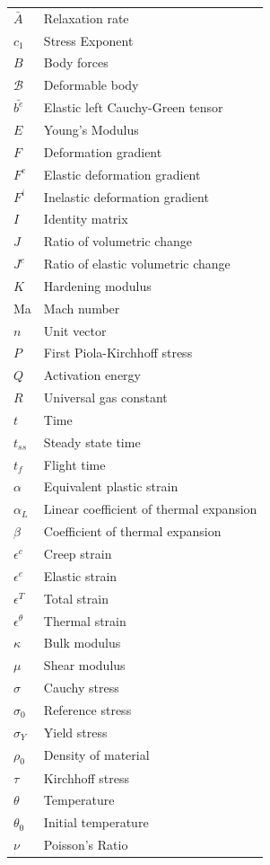 \documentclass[conf]{new-aiaa}
\begin{document}
{\renewcommand\arraystretch{1.0}
\noindent\begin{longtable*}{@{}l @{\quad=\quad} l@{}}
$\bar{A}$    & Relaxation rate\\
$c_1$        & Stress Exponent\\
$B$          & Body forces \\
$\mathcal{B}$& Deformable body \\
$\bar{b^e}$  & Elastic left Cauchy-Green tensor \\
$E$          & Young's Modulus \\
$F$          & Deformation gradient\\
$F^e$        & Elastic deformation gradient\\
$F^i$        & Inelastic deformation gradient\\
$I$          & Identity matrix \\
$J$          & Ratio of volumetric change\\
$J^e$        & Ratio of elastic volumetric change\\
$K$          & Hardening modulus \\
Ma           & Mach number\\
$n$          & Unit vector \\
$P$          & First Piola-Kirchhoff stress\\
$Q$          & Activation energy\\
$R$          & Universal gas constant\\
$t$          & Time\\
$t_{ss}$     & Steady state time\\
$t_{f}$      & Flight time \\
$\alpha$     & Equivalent plastic strain \\
$\alpha_L$   & Linear coefficient of thermal expansion\\
$\beta$      & Coefficient of thermal expansion \\
$\epsilon^c$ & Creep strain\\
$\epsilon^e$ & Elastic strain\\
$\epsilon^T$ & Total strain\\
$\epsilon^\theta$ & Thermal strain\\
$\kappa$     & Bulk modulus \\
$\mu$        & Shear modulus \\
$\sigma$     & Cauchy stress\\
$\sigma_0$   & Reference stress\\
$\sigma_Y$   & Yield stress \\
$\rho_0$     & Density of material\\
$\tau$       & Kirchhoff stress\\
$\theta$     & Temperature\\
$\theta_0$   & Initial temperature \\
$\nu$        & Poisson's Ratio 
\end{longtable*}}
\end{document}

